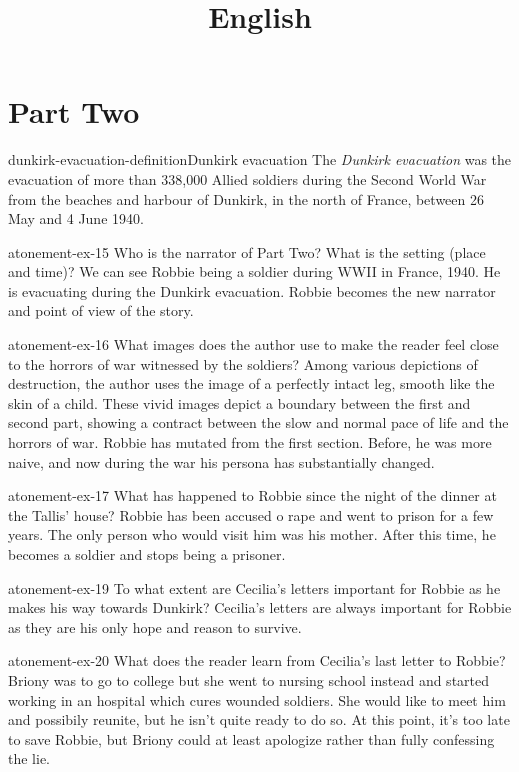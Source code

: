 \documentclass[preview]{standalone}
\begin{document}
\title{English}
\genpage

\section{Part Two}

\begin{snippetdefinition}{dunkirk-evacuation-definition}{Dunkirk evacuation}
    The \textit{Dunkirk evacuation} was the evacuation of more than 338,000
    Allied soldiers during the Second World War from the beaches
    and harbour of Dunkirk, in the north of France, between 26 May and 4 June 1940. 
\end{snippetdefinition}

\begin{snippetexercise}{atonement-ex-15}
    {Who is the narrator of Part Two? What is the setting (place and time)?}
    We can see Robbie being a soldier during WWII in France, 1940.
    He is evacuating during the Dunkirk evacuation.
    Robbie becomes the new narrator and point of view of the story.
\end{snippetexercise}

\begin{snippetexercise}{atonement-ex-16}
    {What images does the author use to make the reader feel close to the horrors of war witnessed
    by the soldiers?}
    Among various depictions of destruction, the author uses the image of a perfectly
    intact leg, smooth like the skin of a child.
    These vivid images depict a boundary between the first and second
    part, showing a contract between the slow and normal pace of life
    and the horrors of war.
    Robbie has mutated from the first section. Before, he was more naive,
    and now during the war his persona has substantially changed.
\end{snippetexercise}

\begin{snippetexercise}{atonement-ex-17}
    {What has happened to Robbie since the night of the dinner at the Tallis' house?}
    Robbie has been accused o rape and went to prison for a few years.
    The only person who would visit him was his mother.
    After this time, he becomes a soldier and stops being a prisoner.
\end{snippetexercise}

\begin{snippetexercise}{atonement-ex-19}
    {To what extent are Cecilia's letters important for Robbie as he makes his way towards Dunkirk?}
    Cecilia's letters are always important for Robbie as they are
    his only hope and reason to survive.
\end{snippetexercise}

\begin{snippetexercise}{atonement-ex-20}
    {What does the reader learn from Cecilia's last letter to Robbie?}
    Briony was to go to college but she went to nursing school instead
    and started working in an hospital which cures wounded soldiers.
    She would like to meet him and possibily reunite,
    but he isn't quite ready to do so.
    At this point, it's too late to save Robbie, but Briony could at least
    apologize rather than fully confessing the lie.
\end{snippetexercise}
\end{document}
